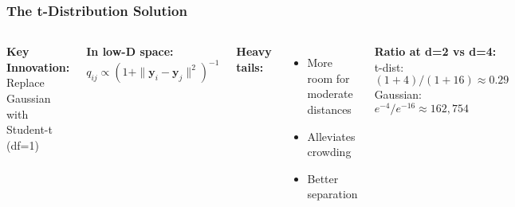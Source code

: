\documentclass[aspectratio=169]{beamer}
\begin{document}
\begin{frame}
\frametitle{The t-Distribution Solution}
\begin{columns}[T]
\textbf{Key Innovation:}\\
Replace Gaussian with Student-t (df=1)

\vspace{0.3cm}
\textbf{In low-D space:}
$$q_{ij} \propto (1 + \|\mathbf{y}_i - \mathbf{y}_j\|^2)^{-1}$$

\vspace{0.3cm}
\textbf{Heavy tails:}
\begin{itemize}
\small
\item More room for moderate distances
\item Alleviates crowding
\item Better separation
\end{itemize}


\textbf{Ratio at d=2 vs d=4:}\\
\small t-dist: $(1+4)/(1+16) \approx 0.29$\\
\small Gaussian: $e^{-4}/e^{-16} \approx 162,754$
\end{columns}
\end{frame}
\end{document}
